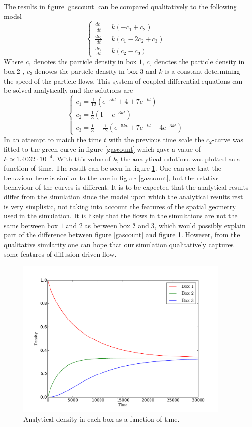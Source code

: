 \documentclass[12pt,a4paper]{article}
\begin{document}
The results in figure \ref{gascount} can be compared qualitatively to the following model
\[
\left\{
\begin{array}{l}
  \frac{dc_1}{dt}=k(-c_1+c_2)\\
  \frac{dc_2}{dt}=k(c_1-2c_2+c_3)\\
  \frac{dc_3}{dt}=k(c_2-c_3)
\end{array}\right.
\]
Where $c_1$ denotes the particle density in box $1$, $c_2$ denotes the particle density in box $2$
, $c_3$ denotes the particle density in box $3$ and $k$ is a constant determining the speed of
the particle flows. This system of coupled differential equations can be solved analytically and
the solutions are
\[
\left\{
\begin{array}{l}
  c_1=\frac{1}{12}(e^{-5kt}+4+7e^{-kt})\\
  c_2=\frac{1}{3}(1-e^{-3kt})\\
  c_3=\frac{1}{3}-\frac{1}{12}(e^{-5kt}+7e^{-kt}-4e^{-3kt})
\end{array}\right.
\]
In an attempt to match the time $t$ with the previous time scale 
the $c_2$-curve was fitted to the green curve in figure \ref{gascount} which gave a value of
$k\approx 1.4032 \cdot 10^{-4}$. With this value of $k$, the analytical solutions was plotted
as a function of time. The result can be seen in figure \ref{gascount_anal}. One can see that
the behaviour here is similar to the one in figure \ref{gascount}, but the relative behaviour
of the curves is different. It is to be expected that the analytical results differ from the
simulation since the model upon which the analytical results rest is very simplistic, not 
taking into account the features of the spatial geometry used in the simulation. It is
likely that the flows in the simulations are not the same between box $1$ and $2$ as between
box $2$ and $3$, which would possibly explain part of the difference between figure \ref{gascount}
and figure \ref{gascount_anal}. 
However, from the qualitative similarity one can hope that our simulation qualitatively
captures some features of diffusion driven flow.

\begin{figure}[htp]
\centering
  \includegraphics[width=300pt]{figs/gascount_anal.pdf}
\caption{Analytical density in each box as a function of time.}
\label{gascount_anal}
\end{figure}
\end{document}
